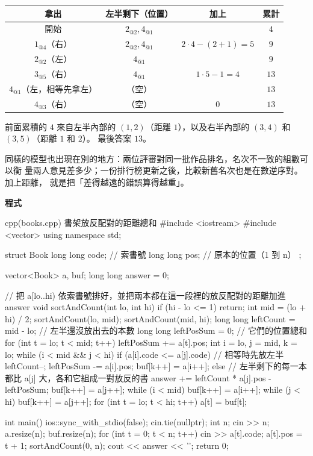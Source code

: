 \begin{center}
\begin{tabular}{cccc}
\toprule
拿出 & 左半剩下（位置） & 加上 & 累計 \\
\midrule
開始 & $2_{@2}, 4_{@1}$ & & $4$ \\
$1_{@4}$（右） & $2_{@2}, 4_{@1}$ & $2 \cdot 4 - (2 + 1) = 5$ & $9$ \\
$2_{@2}$（左） & $4_{@1}$ & & $9$ \\
$3_{@5}$（右） & $4_{@1}$ & $1 \cdot 5 - 1 = 4$ & $13$ \\
$4_{@1}$（左，相等先拿左） & （空） & & $13$ \\
$4_{@3}$（右） & （空） & $0$ & $13$ \\
\bottomrule
\end{tabular}
\end{center}

前面累積的 $4$ 來自左半內部的 $(1,2)$（距離 $1$），以及右半內部的 $(3,4)$ 和
$(3,5)$（距離 $1$ 和 $2$）。 最後答案 $13$。

同樣的模型也出現在別的地方：兩位評審對同一批作品排名，名次不一致的組數可以衡
量兩人意見差多少；一份排行榜更新之後，比較新舊名次也是在數逆序對。 加上距離，
就是把「差得越遠的錯誤算得越重」。

\textbf{程式}

\begin{example}[label=ex:rec-books]{cpp}{(books.cpp) 書架放反配對的距離總和}
#include <iostream>
#include <vector>
using namespace std;

struct Book {
    long long code;   // 索書號
    long long pos;    // 原本的位置（1 到 n）
};

vector<Book> a, buf;
long long answer = 0;

// 把 a[lo..hi) 依索書號排好，並把兩本都在這一段裡的放反配對的距離加進 answer
void sortAndCount(int lo, int hi) {
    if (hi - lo <= 1) {
        return;
    }
    int mid = (lo + hi) / 2;
    sortAndCount(lo, mid);
    sortAndCount(mid, hi);
    long long leftCount = mid - lo;   // 左半還沒放出去的本數
    long long leftPosSum = 0;         // 它們的位置總和
    for (int t = lo; t < mid; t++) {
        leftPosSum += a[t].pos;
    }
    int i = lo, j = mid, k = lo;
    while (i < mid && j < hi) {
        if (a[i].code <= a[j].code) {          // 相等時先放左半
            leftCount--;
            leftPosSum -= a[i].pos;
            buf[k++] = a[i++];
        } else {
            // 左半剩下的每一本都比 a[j] 大，各和它組成一對放反的書
            answer += leftCount * a[j].pos - leftPosSum;
            buf[k++] = a[j++];
        }
    }
    while (i < mid) {
        buf[k++] = a[i++];
    }
    while (j < hi) {
        buf[k++] = a[j++];
    }
    for (int t = lo; t < hi; t++) {
        a[t] = buf[t];
    }
}

int main() {
    ios::sync_with_stdio(false);
    cin.tie(nullptr);
    int n;
    cin >> n;
    a.resize(n);
    buf.resize(n);
    for (int t = 0; t < n; t++) {
        cin >> a[t].code;
        a[t].pos = t + 1;
    }
    sortAndCount(0, n);
    cout << answer << '\n';
    return 0;
}
\end{example}

